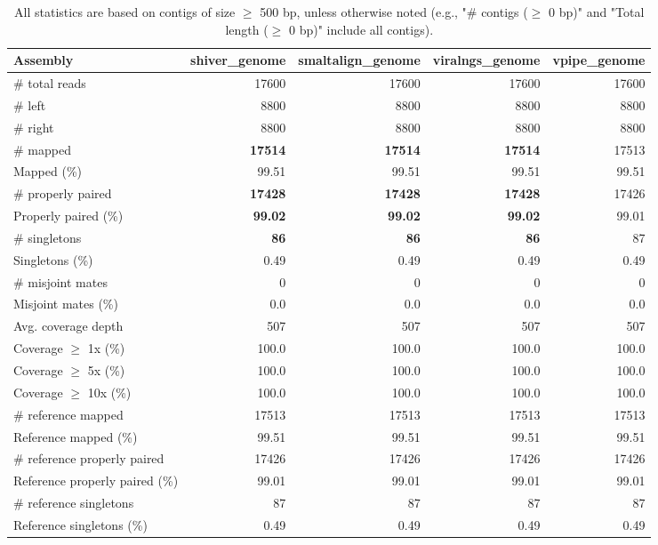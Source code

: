 \documentclass[12pt,a4paper]{article}
\begin{document}
\begin{table}[ht]
\begin{center}
\caption{All statistics are based on contigs of size $\geq$ 500 bp, unless otherwise noted (e.g., "\# contigs ($\geq$ 0 bp)" and "Total length ($\geq$ 0 bp)" include all contigs).}
\begin{tabular}{|l*{4}{|r}|}
\hline
Assembly & shiver\_genome & smaltalign\_genome & viralngs\_genome & vpipe\_genome \\ \hline
\# total reads & 17600 & 17600 & 17600 & 17600 \\ \hline
\# left & 8800 & 8800 & 8800 & 8800 \\ \hline
\# right & 8800 & 8800 & 8800 & 8800 \\ \hline
\# mapped & {\bf 17514} & {\bf 17514} & {\bf 17514} & 17513 \\ \hline
Mapped (\%) & 99.51 & 99.51 & 99.51 & 99.51 \\ \hline
\# properly paired & {\bf 17428} & {\bf 17428} & {\bf 17428} & 17426 \\ \hline
Properly paired (\%) & {\bf 99.02} & {\bf 99.02} & {\bf 99.02} & 99.01 \\ \hline
\# singletons & {\bf 86} & {\bf 86} & {\bf 86} & 87 \\ \hline
Singletons (\%) & 0.49 & 0.49 & 0.49 & 0.49 \\ \hline
\# misjoint mates & 0 & 0 & 0 & 0 \\ \hline
Misjoint mates (\%) & 0.0 & 0.0 & 0.0 & 0.0 \\ \hline
Avg. coverage depth & 507 & 507 & 507 & 507 \\ \hline
Coverage $\geq$ 1x (\%) & 100.0 & 100.0 & 100.0 & 100.0 \\ \hline
Coverage $\geq$ 5x (\%) & 100.0 & 100.0 & 100.0 & 100.0 \\ \hline
Coverage $\geq$ 10x (\%) & 100.0 & 100.0 & 100.0 & 100.0 \\ \hline
\# reference mapped & 17513 & 17513 & 17513 & 17513 \\ \hline
Reference mapped (\%) & 99.51 & 99.51 & 99.51 & 99.51 \\ \hline
\# reference properly paired & 17426 & 17426 & 17426 & 17426 \\ \hline
Reference properly paired (\%) & 99.01 & 99.01 & 99.01 & 99.01 \\ \hline
\# reference singletons & 87 & 87 & 87 & 87 \\ \hline
Reference singletons (\%) & 0.49 & 0.49 & 0.49 & 0.49 \\ \hline

\end{tabular}
\end{center}
\end{table}
\end{document}
